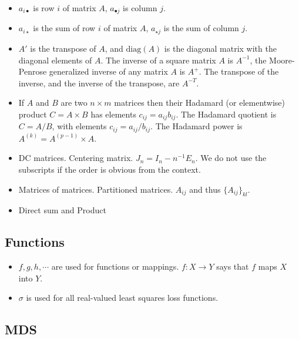 \documentclass[
  12pt,
  letterpaper,
  DIV=11,
  numbers=noendperiod]{scrartcl}
\begin{document}
\begin{itemize}
\item
  \(a_{i\bullet}\) is row \(i\) of matrix \(A\), \(a_{\bullet j}\) is
  column \(j\).
\item
  \(a_{i\star}\) is the sum of row \(i\) of matrix \(A\),
  \(a_{\star j}\) is the sum of column \(j\).
\item
  \(A'\) is the transpose of \(A\), and \(\text{diag}(A)\) is the
  diagonal matrix with the diagonal elements of \(A\). The inverse of a
  square matrix \(A\) is \(A^{-1}\), the Moore-Penrose generalized
  inverse of any matrix \(A\) is \(A^+\). The transpose of the inverse,
  and the inverse of the transpose, are \(A^{-T}\).
\item
  If \(A\) and \(B\) are two \(n\times m\) matrices then their Hadamard
  (or elementwise) product \(C=A\times B\) has elements
  \(c_{ij}=a_{ij}b_{ij}\). The Hadamard quotient is \(C=A/B\), with
  elements \(c_{ij}=a_{ij}/b_{ij}\). The Hadamard power is
  \(A^{(k)}=A^{(p-1)}\times A\).
\item
  DC matrices. Centering matrix. \(J_n=I_n-n^{-1}E_n\). We do not use
  the subscripts if the order is obvious from the context.
\item
  Matrices of matrices. Partitioned matrices. \(A_{ij}\) and thus
  \(\{A_{ij}\}_{kl}\).
\item
  Direct sum and Product
\end{itemize}

\subsection*{Functions}\label{functions}

\begin{itemize}
\item
  \(f,g,h,\cdots\) are used for functions or mappings.
  \(f:X\rightarrow Y\) says that \(f\) maps \(X\) into \(Y\).
\item
  \(\sigma\) is used for all real-valued least squares loss functions.
\end{itemize}

\subsection*{MDS}\label{mds}
\end{document}
